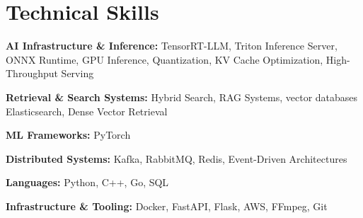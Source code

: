 \documentclass[10pt,a4paper]{article}
\begin{document}
\begin{itemize}[leftmargin=*,
itemsep=1pt,
topsep=0pt,
parsep=1pt,
partopsep=0pt]


\end{itemize}



\section{Technical Skills}

\textbf{AI Infrastructure \& Inference:}
TensorRT-LLM, Triton Inference Server, ONNX Runtime, GPU Inference, Quantization, KV Cache Optimization, High-Throughput Serving \par\vspace{0pt}

\textbf{Retrieval \& Search Systems:} Hybrid Search, RAG Systems, vector databases Elasticsearch, Dense Vector Retrieval \par\vspace{0pt}

\textbf{ML Frameworks:}
PyTorch \par\vspace{0pt}

\textbf{Distributed Systems:}
Kafka, RabbitMQ, Redis, Event-Driven Architectures \par\vspace{0pt}

\textbf{Languages:}
Python, C++, Go, SQL \par\vspace{0pt}

\textbf{Infrastructure \& Tooling:}
Docker, FastAPI, Flask, AWS, FFmpeg, Git
\end{document}
